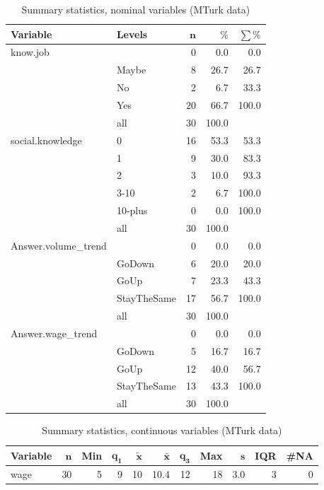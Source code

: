\documentclass[a4paper,10pt]{article}\usepackage[]{graphicx}\usepackage[]{color}
\begin{document}
\begin{table}[ht]
\centering
{\footnotesize
\begin{tabular}{ll|rrr}
 \textbf{Variable} & \textbf{Levels} & $\mathbf{n}$ & $\mathbf{\%}$ & $\mathbf{\sum \%}$ \\ 
  \hline
know.job &  & 0 & 0.0 & 0.0 \\ 
   & Maybe & 8 & 26.7 & 26.7 \\ 
   & No & 2 & 6.7 & 33.3 \\ 
   & Yes & 20 & 66.7 & 100.0 \\ 
   \hline
 & all & 30 & 100.0 &  \\ 
   \hline
\hline
social.knowledge & 0 & 16 & 53.3 & 53.3 \\ 
   & 1 & 9 & 30.0 & 83.3 \\ 
   & 2 & 3 & 10.0 & 93.3 \\ 
   & 3-10 & 2 & 6.7 & 100.0 \\ 
   & 10-plus & 0 & 0.0 & 100.0 \\ 
   \hline
 & all & 30 & 100.0 &  \\ 
   \hline
\hline
Answer.volume\_trend &  & 0 & 0.0 & 0.0 \\ 
   & GoDown & 6 & 20.0 & 20.0 \\ 
   & GoUp & 7 & 23.3 & 43.3 \\ 
   & StayTheSame & 17 & 56.7 & 100.0 \\ 
   \hline
 & all & 30 & 100.0 &  \\ 
   \hline
\hline
Answer.wage\_trend &  & 0 & 0.0 & 0.0 \\ 
   & GoDown & 5 & 16.7 & 16.7 \\ 
   & GoUp & 12 & 40.0 & 56.7 \\ 
   & StayTheSame & 13 & 43.3 & 100.0 \\ 
   \hline
 & all & 30 & 100.0 &  \\ 
   \hline
\hline
\end{tabular}
}
\caption{Summary statistics, nominal variables (MTurk data)} 
\label{tab1:41-2020}
\end{table}
\begin{table}[ht]
\centering
{\footnotesize
\begin{tabular}{lrrrrrrrrrr}
 \textbf{Variable} & $\mathbf{n}$ & \textbf{Min} & $\mathbf{q_1}$ & $\mathbf{\widetilde{x}}$ & $\mathbf{\bar{x}}$ & $\mathbf{q_3}$ & \textbf{Max} & $\mathbf{s}$ & \textbf{IQR} & \textbf{\#NA} \\ 
  \hline
wage & 30 & 5 & 9 & 10 & 10.4 & 12 & 18 & 3.0 & 3 & 0 \\ 
  \end{tabular}
}
\caption{Summary statistics, continuous variables (MTurk data)} 
\label{tab2:41-2020}
\end{table}
\end{document}
